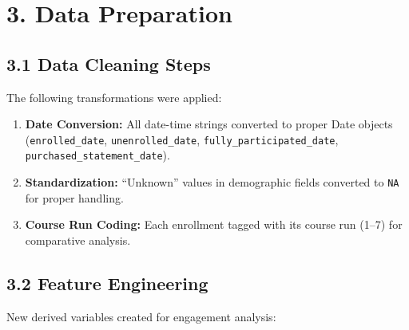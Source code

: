 \documentclass[
]{article}
\begin{document}
\section{3. Data Preparation}\label{data-preparation}

\subsection{3.1 Data Cleaning Steps}\label{data-cleaning-steps}

The following transformations were applied:

\begin{enumerate}
\def\labelenumi{\arabic{enumi}.}
\item
  \textbf{Date Conversion:} All date-time strings converted to proper
  Date objects (\texttt{enrolled\_date}, \texttt{unenrolled\_date},
  \texttt{fully\_participated\_date},
  \texttt{purchased\_statement\_date}).
\item
  \textbf{Standardization:} ``Unknown'' values in demographic fields
  converted to \texttt{NA} for proper handling.
\item
  \textbf{Course Run Coding:} Each enrollment tagged with its course run
  (1--7) for comparative analysis.
\end{enumerate}

\subsection{3.2 Feature Engineering}\label{feature-engineering-1}

New derived variables created for engagement analysis:
\end{document}
